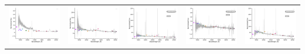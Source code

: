 \begin{center}
\begin{longtable}{l l l l l }
    \includegraphics[width=0.19\linewidth, clip]{Figs/Figs-lamost/spec-56948-EG212551N003203M01_sp06-078-STRIPE82-0120-000615.pdf} & \includegraphics[width=0.19\linewidth, clip]{Figs/Figs-lamost/spec-56948-EG212551N003203M01_sp13-186-STRIPE82-0120-045064.pdf} & \includegraphics[width=0.19\linewidth, clip]{Figs/Figs-lamost/spec-56976-EG215014S003621B01_sp06-085-SPLUS-s02s04-032140.pdf} & \includegraphics[width=0.19\linewidth, clip]{Figs/Figs-lamost/spec-56978-EG001639N015102M01_sp01-071-STRIPE82-0008-013742.pdf} & \includegraphics[width=0.19\linewidth, clip]{Figs/Figs-lamost/spec-56983-EG233528N011847M01_sp02-123-SPLUS-s02s22-033516.pdf} \\

\end{longtable}
\end{center}
